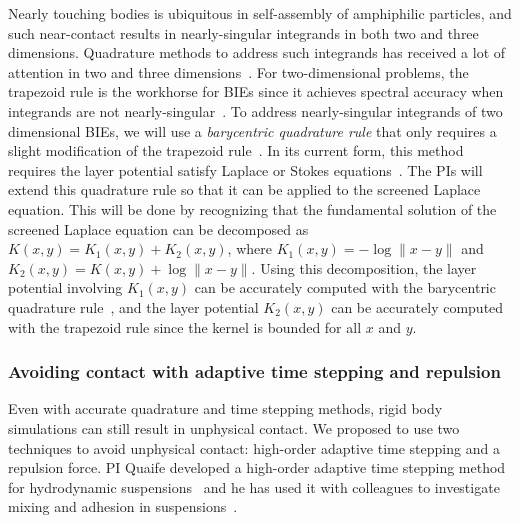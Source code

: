 Nearly touching bodies is ubiquitous in self-assembly of amphiphilic
particles, and such near-contact results in nearly-singular integrands
in both two and three dimensions. Quadrature methods to address such
integrands has received a lot of attention in two and three
dimensions~\cite{alpert, kapur, sidi, duffy, bruno1, bruno2, davis_1984,
graglia_2008, hackbusch_sauter_1994, jarvenpaa_2003, khayat_2005,
schwab_1992, ying_2006, beale1, beale2, goodman_1990, haroldson_1998,
lowengrub_1993, schwab_1992, ggq1, ggq2, ggq3, helsing_2008a,
helsing_integral_2009, helsing_tutorial_2012, klockner2013jcp, qbx2,
wala2019jcp, af2018sisc, siegel2018jcp, rachh2017jcp, ding2019arxiv,
bar2014}. For two-dimensional problems, the trapezoid rule is the
workhorse for BIEs since it achieves spectral accuracy when integrands
are not nearly-singular~\cite{tre-wei2014}. To address nearly-singular
integrands of two dimensional BIEs, we will use a {\em barycentric
quadrature rule} that only requires a slight modification of the
trapezoid rule~\cite{ioa-pap-per1991}. In its current form, this method
requires the layer potential satisfy Laplace or Stokes
equations~\cite{bar-wu-vee2015, chi-moo-qua2020}. The PIs will extend
this quadrature rule so that it can be applied to the screened Laplace
equation. This will be done by recognizing that the fundamental solution
of the screened Laplace equation can be decomposed as $K(x,y) = K_1(x,y)
+ K_2(x,y)$, where $K_1(x,y) = -\log\|x - y\|$ and $K_2(x,y) = K(x,y) +
\log\|x - y\|$. Using this decomposition, the layer potential involving
$K_1(x,y)$ can be accurately computed with the barycentric quadrature
rule~\cite{ioa-pap-per1991}, and the layer potential $K_2(x,y)$ can be
accurately computed with the trapezoid rule since the kernel is bounded
for all $x$ and $y$.

\subsubsection{Avoiding contact with adaptive time stepping and
repulsion}
\label{subsec:timeStepping}

Even with accurate quadrature and time stepping methods, rigid body
simulations can still result in unphysical contact. We proposed to use
two techniques to avoid unphysical contact: high-order adaptive time
stepping and a repulsion force. PI Quaife developed a high-order
adaptive time stepping method for hydrodynamic
suspensions~\cite{qua-bir2016} and he has used it with colleagues to
investigate mixing and adhesion in suspensions~\cite{qua-vee-you2019,
kab-qua-bir2017}.



